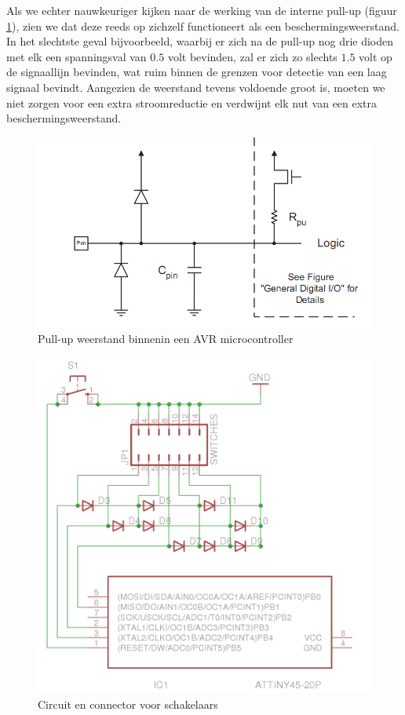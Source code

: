 \documentclass[verslag.tex]{subfiles}
\begin{document}
Als we echter nauwkeuriger kijken naar de werking van de interne pull-up (figuur \ref{fig:avr_pullup}), zien we dat deze reeds op zichzelf functioneert als een beschermingsweerstand. In het slechtste geval bijvoorbeeld, waarbij er zich na de pull-up nog drie dioden met elk een spanningsval van $0.5$ volt bevinden, zal er zich zo slechts $1.5$ volt op de signaallijn bevinden, wat ruim binnen de grenzen voor detectie van een laag signaal bevindt. Aangezien de weerstand tevens voldoende groot is, moeten we niet zorgen voor een extra stroomreductie en verdwijnt elk nut van een extra beschermingsweerstand.

\begin{figure}
	\includegraphics[width=\textwidth]{afbeeldingen/avr_pullup}
	\caption{Pull-up weerstand binnenin een AVR microcontroller}
	\label{fig:avr_pullup}
\end{figure}

\begin{figure}
	\includegraphics[width=\textwidth]{afbeeldingen/circuit_schakelaars}
	\caption{Circuit en connector voor schakelaars}
\end{figure}
\end{document}
